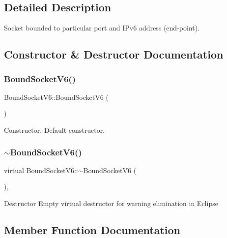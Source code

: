 \subsection{Detailed Description}
Socket bounded to particular port and I\+Pv6 address (end-\/point). 

\subsection{Constructor \& Destructor Documentation}
\mbox{\label{classBoundSocketV6_a99bee564490f6efa36fe13355adcb7cc}} 
\subsubsection{\texorpdfstring{Bound\+Socket\+V6()}{BoundSocketV6()}}
{\footnotesize\ttfamily Bound\+Socket\+V6\+::\+Bound\+Socket\+V6 (\begin{DoxyParamCaption}{ }\end{DoxyParamCaption})}

Constructor. Default constructor. \mbox{\label{classBoundSocketV6_ac1c31ca5c4be106325146f76af312144}} 
\subsubsection{\texorpdfstring{$\sim$\+Bound\+Socket\+V6()}{~BoundSocketV6()}}
{\footnotesize\ttfamily virtual Bound\+Socket\+V6\+::$\sim$\+Bound\+Socket\+V6 (\begin{DoxyParamCaption}{ }\end{DoxyParamCaption})\hspace{0.3cm}{\ttfamily [inline]}, {\ttfamily [virtual]}}

Destructor Empty virtual destructor for warning elimination in Eclipse 

\subsection{Member Function Documentation}
\mbox{\label{classBoundSocketV6_a76ed837cd1fb36bbc1383f5e7e381095}} 
